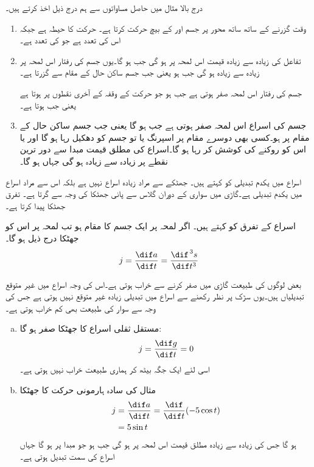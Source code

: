 درج بالا مثال میں حاصل مساواتوں سے ہم درج ذیل اخذ کرتے ہیں۔
\begin{enumerate}[1.]

\item
وقت گزرنے کے ساتھ ساتھ  محور پر جسم  اور  کے بیچ حرکت کرتا ہے۔ حرکت کا حیطہ  ہے جبکہ اس کی تعدد  ہے جو  کی تعدد ہے۔
\item
تفاعل  کی زیادہ سے زیادہ قیمت اس لمحہ پر ہو گی جب  ہو گا۔یوں جسم کی رفتار  اس لمحہ پر زیادہ سے زیادہ  ہو گی جب  ہو یعنی جب جسم ساکن حال کے مقام سے گزرتا ہے۔

جسم کی رفتار اس لمحہ صفر ہوتی ہے جب  ہو جو حرکت کے وقفہ کے آخری نقطوں پر ہوتا ہے یعنی جب  ہوتا ہے۔
\item
جسم کی اسراع  اس لمحہ صفر ہوتی ہے جب  ہو گا یعنی جب جسم ساکن حال کے مقام پر ہو۔کسی بھی دوسرے مقام پر اسپرنگ یا تو جسم کو دھکیل رہا ہو گا اور یا اس کو روکنے کی کوشش کر رہا ہو گا۔اسراع کی مطلق قیمت مبدا سے دور ترین نقطے پر زیادہ سے زیادہ ہو گی جہاں  ہو گا۔  
\end{enumerate}

اسراع میں یکدم تبدیلی کو  کہتے ہیں۔ جھٹکے سے مراد زیادہ اسراع نہیں ہے بلکہ اس سے مراد اسراع میں یکدم تبدیلی ہے۔گاڑی میں سواری کے دوران گلاس سے پانی جھٹکا کی وجہ سے  گرتا ہے۔ تفرق  جھٹکا پیدا کرتا ہے۔

اسراع کے تفرق کو  کہتے ہیں۔ اگر لمحہ  پر ایک جسم کا مقام  ہو تب لمحہ  پر اس کو جھٹکا درج ذیل ہو گا۔
\begin{align*}
j=\frac{\dif a}{\dif t}=\frac{\dif ^{\,3}s}{\dif t^3}
\end{align*}

بعض لوگوں کی طبیعت  گاڑی میں صفر کرنے سے  خراب ہوتی ہے۔اس کی وجہ اسراع میں غیر متوقع تبدیلیاں ہیں۔یوں سڑک پر نظر رکھنے سے اسراع میں تبدیلی زیادہ غیر متوقع نہیں ہوتی ہے جس کی وجہ سے سوار کی طبیعت بھی کم خراب ہوتی ہے۔  

\begin{enumerate}[a.]

\item
مستقل ثقلی اسراع  کا جھٹکا صفر ہو گا:
\begin{align*}
j=\frac{\dif g}{\dif t}=0
\end{align*}
اسی لئے ایک جگہ بیٹھ کر ہماری طبیعت خراب نہیں ہوتی ہے۔
\item
مثال  کی سادہ ہارمونی حرکت  کا جھٹکا
\begin{align*}
j&=\frac{\dif a}{\dif t}=\frac{\dif}{\dif t}(-5\cos t)\\
&=5\sin t
\end{align*}
ہو گا جس کی زیادہ سے زیادہ مطلق قیمت اس لمحہ پر ہو گی جب  ہو جو مبدا پر ہو گا جہاں اسراع کی سمت تبدیل ہوتی ہے۔
\end{enumerate}

